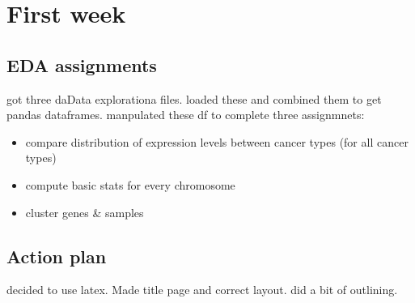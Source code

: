 \chapter{First week}
\section{EDA assignments}
got three daData explorationa files. loaded these and combined them to get pandas dataframes. manpulated these df to complete three assignmnets:
\begin{itemize}
    \item compare distribution of expression levels between cancer types (for all cancer types)
    \item compute basic stats for every chromosome
    \item cluster genes \& samples
\end{itemize}

\section{Action plan}
decided to use latex. Made title page and correct layout. did a bit of outlining.
